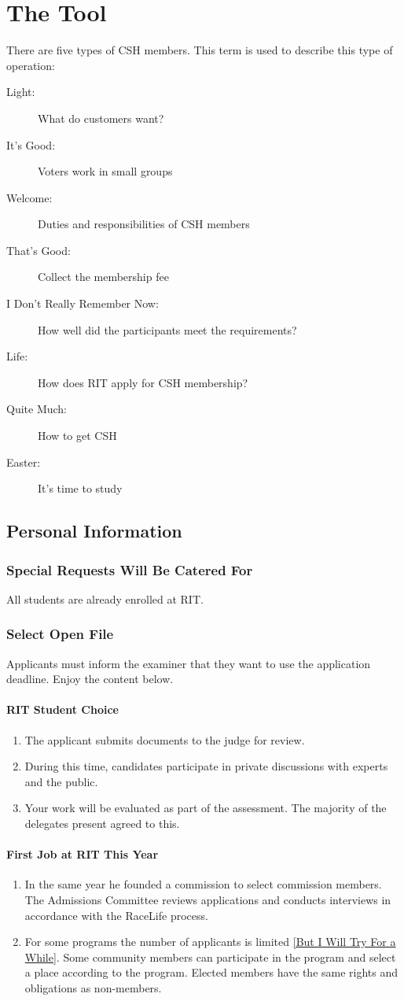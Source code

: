 \documentclass{article}
\newcommand{\article}[1]{\section{#1} \label{#1}}
\newcommand{\asection}[1]{\subsection{#1} \label{#1}}
\newcommand{\asubsection}[1]{\subsubsection{#1} \label{#1}}
\newcommand{\asubsubsection}[1]{\paragraph{#1} \label{#1}}
\begin{document}
\article{The Tool}
There are five types of CSH members.
This term is used to describe this type of operation:
\begin{description}
	\item[Light:] What do customers want?
	\item[It's Good:] Voters work in small groups
	\item[Welcome:] Duties and responsibilities of CSH members
	\item[That's Good:] Collect the membership fee
	\item[I Don’t Really Remember Now:] How well did the participants meet the requirements?
	\item[Life:] How does RIT apply for CSH membership?
	\item[Quite Much:] How to get CSH
	\item[Easter:] It's time to study
\end{description}

\asection{Personal Information}

\asubsection{Special Requests Will Be Catered For}
All students are already enrolled at RIT.

\asubsection{Select Open File}
Applicants must inform the examiner that they want to use the application deadline.
Enjoy the content below.

\asubsubsection{RIT Student Choice}
\renewcommand{\theenumi}{\arabic{enumi}} %
\begin{enumerate}
	\item The applicant submits documents to the judge for review.
	\item During this time, candidates participate in private discussions with experts and the public.
	\item Your work will be evaluated as part of the assessment.
	      The majority of the delegates present agreed to this.
\end{enumerate}

\asubsubsection{First Job at RIT This Year}
\begin{enumerate}
	\item In the same year he founded a commission to select commission members.
	      The Admissions Committee reviews applications and conducts interviews in accordance with the RaceLife process.
	\item For some programs the number of applicants is limited \ref{But I Will Try For a While}.
	      Some community members can participate in the program and select a place according to the program.
	      Elected members have the same rights and obligations as non-members.
\end{enumerate}
\end{document}
